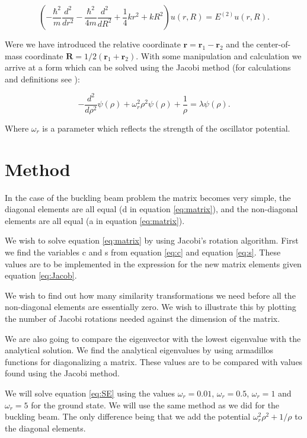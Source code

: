 \documentclass[norsk,a4paper,12pt]{article}
\begin{document}
\begin{equation*}
\left(  -\frac{\hbar^2}{m} \frac{d^2}{dr^2} -\frac{\hbar^2}{4 m} \frac{d^2}{dR^2}+ \frac{1}{4} k r^2+  kR^2\right)u(r,R)  = E^{(2)} u(r,R).
\end{equation*}

Were we have introduced the relative coordinate $\mathbf{r} = \mathbf{r}_1-\mathbf{r}_2$
and the center-of-mass coordinate $\mathbf{R}=1/2(\mathbf{r}_1+\mathbf{r}_2)$. With some manipulation and calculation we arrive at a form which can be solved using the Jacobi method (for calculations and definitions see \cite{94}):

\begin{equation}
  -\frac{d^2}{d\rho^2} \psi(\rho) + \omega_r^2\rho^2\psi(\rho) +\frac{1}{\rho} = \lambda \psi(\rho).
\label{eq:SE}
\end{equation}

Where $\omega_r$ is a parameter which reflects the strength of the oscillator potential.

\section{Method}


In the case of the buckling beam problem the matrix becomes very simple, the diagonal elements are all equal (d in equation \ref{eq:matrix}), and the non-diagonal elements are all equal (a in equation \ref{eq:matrix}). 

We wish to solve equation \ref{eq:matrix} by using Jacobi's rotation algorithm. First we find the variables c and s from equation \ref{eq:c} and equation \ref{eq:s}. These values are to be implemented in the expression for the new matrix elements given equation \ref{eq:Jacob}.

We wish to find out how many similarity transformations we need before all the non-diagonal elements are essentially zero. We wish to illustrate this by plotting the number of Jacobi rotations needed against the dimension of the matrix. 

We are also going to compare the eigenvector with the lowest eigenvalue with the analytical solution. We find the analytical eigenvalues by using armadillos functions for diagonalizing a matrix. These values are to be compared with values found using the Jacobi method. 


We will solve equation \ref{eq:SE} using the values $\omega_r = 0.01$, $\omega_r = 0.5$, $\omega_r =1$ and $\omega_r = 5$ for the ground state. We will use the same method as we did for the buckling beam. The only difference being that we add the potential $\omega_r^2\rho^2+1/\rho$ to the diagonal elements.
\end{document}
